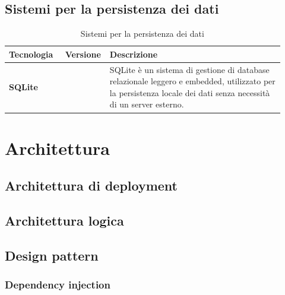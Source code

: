\documentclass[a4paper,12pt]{article}
\begin{document}
{        \subsection{Sistemi per la persistenza dei dati}
        \begin{table}[H]
            \captionsetup{skip=10pt}
            \caption{Sistemi per la persistenza dei dati}
            \begin{tabular}{|>{\centering\arraybackslash}m{0.20\linewidth}|>{\centering\arraybackslash}m{0.10\linewidth}|>{\centering\arraybackslash}m{0.62\linewidth}|}
                \hline
                \textbf{Tecnologia} & \textbf{Versione} & \textbf{Descrizione} \\
                \hline
                \textbf{SQLite} &  & SQLite è un sistema di gestione di database relazionale leggero e embedded, utilizzato per la persistenza locale dei dati senza necessità di un server esterno. \\
                \hline
            \end{tabular}
        \end{table}
    }

    \section{Architettura} {
        \subsection{Architettura di deployment} {

        }

        \subsection{Architettura logica} {
            
        }

        \subsection{Design pattern} {
            \subsubsection{Dependency injection} {
                
            }
        }
    }
\end{document}
